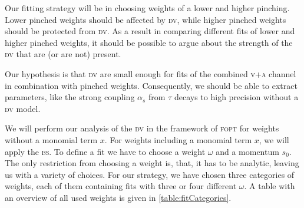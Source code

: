 \documentclass[../../index.tex]{subfiles}
\begin{document}
Our fitting strategy will be in choosing weights of a lower and higher pinching.
Lower pinched weights should be affected by \textsc{dv}, while higher pinched
weights should be protected from \textsc{dv}. As a result in comparing different
fits of lower and higher pinched weights, it should be possible to argue about
the strength of the \textsc{dv} that are (or are not) present.

Our hypothesis is that \textsc{dv} are small enough for fits of the combined
\textsc{v+a} channel in combination with pinched weights. Consequently, we
should be able to extract parameters, like the strong coupling \(\alpha_s\) from
\(\tau\) decays to high precision without a \textsc{dv} model.

We will perform our analysis of the \textsc{dv} in the framework of
\textsc{fopt} for weights without a monomial term \(x\). For weights including a
monomial term \(x\), we will apply the \textsc{bs}. To define a fit we have to
choose a weight \(\omega\) and a momentum \(s_0\). The only restriction from
choosing a weight is, that, it has to be analytic, leaving us with a variety of
choices. For our strategy, we have chosen three categories of weights, each of
them containing fits with three or four different \(\omega\). A table with an
overview of all used weights is given in \cref{table:fitCategories}.
\end{document}
